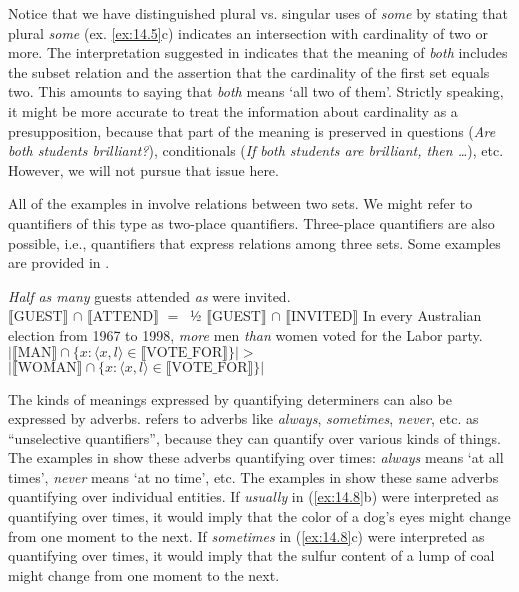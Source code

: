 Notice that we have distinguished plural vs. singular uses of \textit{some} by stating that plural \textit{some} (ex. \ref{ex:14.5}c) indicates an intersection with cardinality of two or more. The interpretation suggested in  indicates that the meaning of \textit{both} includes the subset relation and the assertion that the cardinality of the first set equals two. This amounts to saying that \textit{both} means ‘all two of them’. Strictly speaking, it might be more accurate to treat the information about cardinality as a presupposition, because that part of the meaning is preserved in questions (\textit{Are} \textit{both students brilliant?}), conditionals (\textit{If} \textit{both students are brilliant, then …}), etc. However, we will not pursue that issue here.



All of the examples in  involve relations between two sets. We might refer to quantifiers of this type as two-place quantifiers. Three-place quantifiers are also possible, i.e., quantifiers that express relations among three sets. Some examples are provided in .


\ea \label{ex:14.6}
\ea  \textit{Half as many} guests attended \textit{as} were invited.\\
{\textbar} $\llbracket$GUEST$\rrbracket$  ${\cap}$ $\llbracket$ATTEND$\rrbracket$  {\textbar}  $= \:$  ½  {\textbar} $\llbracket$GUEST$\rrbracket$  ${\cap}$ $\llbracket$INVITED$\rrbracket$  {\textbar}
\ex In every {Australian} election from 1967 to 1998, \textit{more} men \textit{than} women voted for the Labor party.\\
$|\llbracket \text{MAN} \rrbracket \cap  \{x: \langle x, l\rangle \in \llbracket\text{VOTE\_FOR}\rrbracket \}|  >$ \\ 
$| \llbracket \text{WOMAN} \rrbracket \cap \{x: \langle x, l\rangle \in \llbracket \text{VOTE\_FOR}\rrbracket \}|$
\z \z


The kinds of meanings expressed by quantifying determiners can also be expressed by adverbs. \citet{Lewis1975} refers to adverbs like \textit{always}, \textit{sometimes}, \textit{never}, etc. as “unselective quantifiers”, because they can quantify over various kinds of things. The examples in  show these adverbs quantifying over times: \textit{always} means ‘at all times’, \textit{never} means ‘at no time’, etc. The examples in  show these same adverbs quantifying over individual entities. If \textit{usually} in (\ref{ex:14.8}b) were interpreted as quantifying over times, it would imply that the color of a dog’s eyes might change from one moment to the next. If \textit{sometimes} in (\ref{ex:14.8}c) were interpreted as quantifying over times, it would imply that the sulfur content of a lump of coal might change from one moment to the next.



